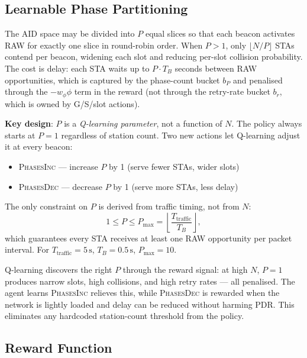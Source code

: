 \documentclass[conference]{IEEEtran}
\begin{document}
\subsection{Learnable Phase Partitioning}

The AID space may be divided into $P$ equal slices so that each beacon
activates RAW for exactly one slice in round-robin order.
When $P > 1$, only $\lfloor N/P \rfloor$ STAs contend per beacon, widening
each slot and reducing per-slot collision probability.
The cost is delay: each STA waits up to $P \cdot T_B$ seconds between RAW
opportunities, which is captured by the phase-count bucket $b_P$ and
penalised through the $-w_\phi\phi$ term in the reward
(not through the retry-rate bucket $b_r$, which is owned by G/S/slot actions).

\textbf{Key design}: $P$ is a \emph{Q-learning parameter}, not a function of
$N$.  The policy always starts at $P = 1$ regardless of station count.
Two new actions let Q-learning adjust it at every beacon:
\begin{itemize}
  \item \textsc{PhasesInc} — increase $P$ by 1 (serve fewer STAs, wider slots)
  \item \textsc{PhasesDec} — decrease $P$ by 1 (serve more STAs, less delay)
\end{itemize}
The only constraint on $P$ is derived from traffic timing, not from $N$:
\begin{equation}
  1 \leq P \leq P_\text{max} = \left\lfloor \frac{T_\text{traffic}}{T_B}
  \right\rfloor,
  \label{eq:phases}
\end{equation}
which guarantees every STA receives at least one RAW opportunity per packet
interval.  For $T_\text{traffic} = 5\,\text{s}$, $T_B = 0.5\,\text{s}$,
$P_\text{max} = 10$.

Q-learning discovers the right $P$ through the reward signal: at high $N$,
$P = 1$ produces narrow slots, high collisions, and high retry rates — all
penalised.  The agent learns \textsc{PhasesInc} relieves this, while
\textsc{PhasesDec} is rewarded when the network is lightly loaded and delay
can be reduced without harming PDR.
This eliminates any hardcoded station-count threshold from the policy.

\subsection{Reward Function}
\end{document}
